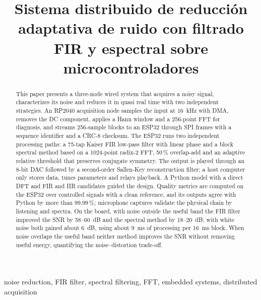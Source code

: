 \documentclass[conference]{IEEEtran}
\begin{document}
\title{Sistema distribuido de reducción adaptativa de ruido con filtrado FIR y espectral sobre microcontroladores}

\author{
}

\maketitle

\begin{abstract}
This paper presents a three-node wired system that acquires a noisy signal,
characterizes its noise and reduces it in quasi real time with two independent
strategies. An RP2040 acquisition node samples the input at 16~kHz with DMA, removes
the DC component, applies a Hann window and a 256-point FFT for diagnosis, and streams
256-sample blocks to an ESP32 through SPI frames with a sequence identifier and a
CRC-8 checksum. The ESP32 runs two independent processing
paths: a 75-tap Kaiser FIR low-pass filter with linear phase and a block spectral
method based on a 1024-point radix-2 FFT, 50\,\% overlap-add and an adaptive relative
threshold that preserves conjugate symmetry. The output is played through an 8-bit DAC
followed by a second-order Sallen-Key reconstruction filter; a host computer only
stores data, tunes parameters and relays playback. A Python model with a direct DFT
and FIR and IIR candidates guided the design. Quality metrics are computed on the ESP32
over controlled signals with a clean reference, and its outputs agree with
Python by more than 99.99\,\%; microphone captures validate the physical chain by
listening and spectra. On the board, with noise outside the useful band
the FIR filter improved the SNR by 58--60~dB and the spectral method by 18--20~dB;
with white noise both gained about 6~dB, using about 9~ms of processing per 16~ms
block. When noise overlaps the useful band neither method improves the SNR without
removing useful energy, quantifying the noise--distortion trade-off.
\end{abstract}

\begin{IEEEkeywords}
noise reduction, FIR filter, spectral filtering, FFT, embedded systems, distributed acquisition
\end{IEEEkeywords}
\end{document}
